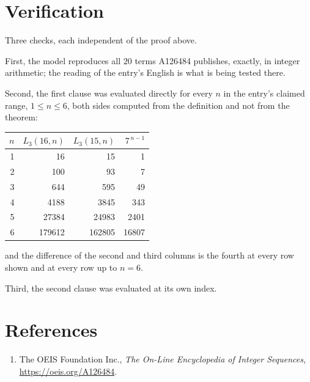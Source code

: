 \documentclass[11pt,a4paper]{article}
\theoremstyle{plain}
\theoremstyle{definition}
\begin{document}
\section{Verification}

Three checks, each independent of the proof above.

First, the model reproduces all $20$ terms A126484 publishes, exactly, in integer
arithmetic; the reading of the entry's English is what is being tested there.

Second, the first clause was evaluated directly for every $n$ in the entry's claimed range,
$1\le n\le6$, both sides computed from the definition and not from the theorem:

\begin{center}
\begin{tabular}{rrrr}
$n$ & $L_{3}(16,n)$ & $L_{3}(15,n)$ & $7^{\,n-1}$ \\ \hline
1 & 16 & 15 & 1 \\
2 & 100 & 93 & 7 \\
3 & 644 & 595 & 49 \\
4 & 4188 & 3845 & 343 \\
5 & 27384 & 24983 & 2401 \\
6 & 179612 & 162805 & 16807 \\
\end{tabular}
\end{center}

\noindent and the difference of the second and third columns is the fourth at every row shown
and at every row up to $n=6$.

Third, the second clause was evaluated at its own index.

\section*{References}
\begin{enumerate}
\item The OEIS Foundation Inc., \emph{The On-Line Encyclopedia of Integer Sequences},
\url{https://oeis.org/A126484}.
\end{enumerate}
\end{document}
